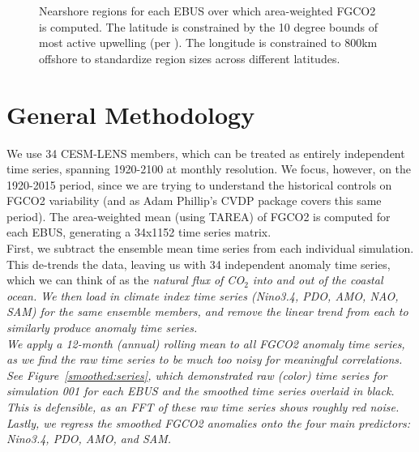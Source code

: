 \documentclass[12pt]{article}
\begin{document}
\begin{figure}[!h]
\begin{subfigure}[b]{0.4\textwidth}
    \end{subfigure}
    \caption{Nearshore regions for each EBUS over which area-weighted FGCO2 is computed. The latitude is constrained by the 10 degree bounds of most active upwelling (per \citet{Chavez:2009}). The longitude is constrained to 800km offshore to standardize region sizes across different latitudes.}
    \label{model:setup}
\end{figure}

\section{General Methodology}
We use 34 CESM-LENS members, which can be treated as entirely independent time series, spanning 1920-2100 at monthly resolution. We focus, however, on the 1920-2015 period, since we are trying to understand the historical controls on FGCO2 variability (and as Adam Phillip's CVDP package covers this same period). The area-weighted mean (using TAREA) of FGCO2 is computed for each EBUS, generating a 34x1152 time series matrix. \\

First, we subtract the ensemble mean time series from each individual simulation. This de-trends the data, leaving us with 34 independent anomaly time series, which we can think of as the \it natural \rm flux of CO$_{2}$ into and out of the coastal ocean. We then load in climate index time series (Nino3.4, PDO, AMO, NAO, SAM) for the same ensemble members, and remove the linear trend from each to similarly produce anomaly time series. \\


We apply a 12-month (annual) rolling mean to all FGCO2 anomaly time series, as we find the raw time series to be much too noisy for meaningful correlations. See Figure~\ref{smoothed:series}, which demonstrated raw (color) time series for simulation 001 for each EBUS and the smoothed time series overlaid in black. This is defensible, as an FFT of these raw time series shows roughly red noise. \\

Lastly, we regress the smoothed FGCO2 anomalies onto the four main predictors: Nino3.4, PDO, AMO, and SAM. 
\end{document}

